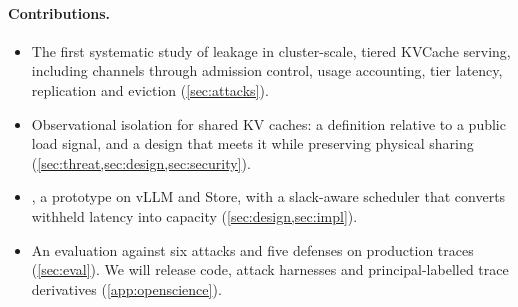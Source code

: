 \paragraph{Contributions.}
\begin{itemize}
\item The first systematic study of leakage in cluster-scale, tiered KVCache
  serving, including channels through admission control, usage accounting, tier
  latency, replication and eviction (\cref{sec:attacks}).
\item Observational isolation for shared KV caches: a definition relative to a
  public load signal, and a design that meets it while preserving physical
  sharing (\cref{sec:threat,sec:design,sec:security}).
\item \sys, a prototype on vLLM and \mc Store, with a slack-aware scheduler that
  converts withheld latency into capacity (\cref{sec:design,sec:impl}).
\item An evaluation against six attacks and five defenses on \mc production
  traces (\cref{sec:eval}). We will release code, attack harnesses and
  principal-labelled trace derivatives (\cref{app:openscience}).
\end{itemize}
